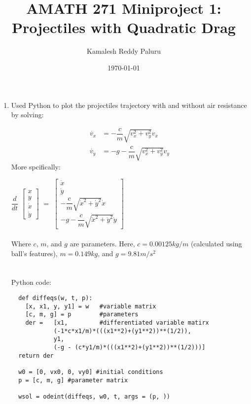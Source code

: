 \documentclass[11pt]{article}
\title{AMATH 271 Miniproject 1: \\ Projectiles with Quadratic Drag}
\author{Kamalesh Reddy Paluru}
\date{\today}
\begin{document}
\maketitle


\begin{enumerate}

\item   Used Python to plot the projectiles trajectory with and without air resistance by solving:

\begin{align}
  \dot{v_x} &= -\dfrac{c}{m} \sqrt{v_x^2+v_y^2} v_x \label{eq1} \\
  \dot{v_y} &= -g -\dfrac{c}{m} \sqrt{v_x^2+v_y^2} v_y  \label{eq2}
\end{align}  
More spcifically:

$\dfrac{d}{dt}$
$\begin{bmatrix}
  x \\
  y \\
  \dot{x} \\
  \dot{y} 
\end{bmatrix}$
$ = $
$\begin{bmatrix}
  \dot{x}  \\
  \dot{y}  \\
  -\dfrac{c}{m} \sqrt{\dot{x}^2+\dot{y}^2} \dot{x} \\
  -g -\dfrac{c}{m} \sqrt{\dot{x}^2+\dot{y}^2} \dot{y} 
\end{bmatrix}$ \\ \\
Where $c$, $m$, and $g$ are parameters. Here, $c = 0.00125 kg/m$ (calculated using ball's features), $m = 0.149kg$, and $g = 9.81m/s^2$
 \\
 \\
 \\
Python code:
 \\
\begin{lstlisting}
  def diffeqs(w, t, p):
    [x, x1, y, y1] = w   #variable matrix
    [c, m, g] = p        #parameters
    der =   [x1,         #differentiated variable matirx
            (-1*c*x1/m)*(((x1**2)+(y1**2))**(1/2)), 
            y1, 
            (-g - (c*y1/m)*(((x1**2)+(y1**2))**(1/2)))]
  return der

  w0 = [0, vx0, 0, vy0] #initial conditions
  p = [c, m, g] #parameter matrix

  wsol = odeint(diffeqs, w0, t, args = (p, ))
\end{lstlisting}


\end{enumerate}
\end{document}
